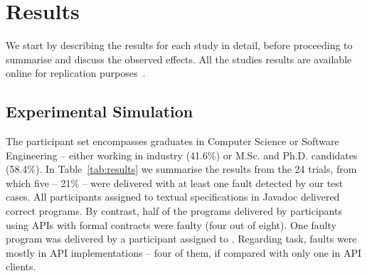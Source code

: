 \section{Results}
\label{sec:results}

We start by describing the results for each study in detail, before proceeding to summarise and discuss the observed effects. All the studies results are available online for replication purposes~\cite{Data-Results}.

\subsection{Experimental Simulation}
\label{sec:expResults}

The participant set encompasses graduates in Computer Science or Software Engineering -- either working in industry (41.6\%) or M.Sc. and Ph.D. candidates (58.4\%).
In Table~\ref{tab:results} we summarise the results from the 24 trials, from which five -- 21\% -- were delivered with at least one fault detected by our test cases.
All participants assigned to textual specifications in Javadoc delivered correct programs.
By contrast, half of the programs delivered by participants using APIs with formal contracts were faulty (four out of eight).
One faulty program was delivered by a participant assigned to \contractjdoc{}.
Regarding task, faults were mostly in API implementations -- four of them, if compared with only one in API clients.



